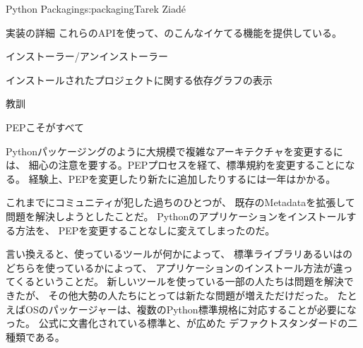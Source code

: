 \begin{aosachapter}{Python Packaging}{s:packaging}{Tarek Ziad\'{e}}
\begin{aosasect1}{実装の詳細}
これらのAPIを使って、のこんなイケてる機能を提供している。

\begin{aosaitemize}
  \item インストーラー/アンインストーラー
  \item インストールされたプロジェクトに関する依存グラフの表示
\end{aosaitemize}

\end{aosasect1}

\begin{aosasect1}{教訓}

\begin{aosasect2}{PEPこそがすべて}

Pythonパッケージングのように大規模で複雑なアーキテクチャを変更するには、
細心の注意を要する。PEPプロセスを経て、標準規約を変更することになる。
経験上、PEPを変更したり新たに追加したりするには一年はかかる。

これまでにコミュニティが犯した過ちのひとつが、
既存のMetadataを拡張して問題を解決しようとしたことだ。
Pythonのアプリケーションをインストールする方法を、
PEPを変更することなしに変えてしまったのだ。

言い換えると、使っているツールが何かによって、
標準ライブラリあるいはのどちらを使っているかによって、
アプリケーションのインストール方法が違ってくるということだ。
新しいツールを使っている一部の人たちは問題を解決できたが、
その他大勢の人たちにとっては新たな問題が増えただけだった。
たとえばOSのパッケージャーは、複数のPython標準規格に対応することが必要になった。
公式に文書化されている標準と、が広めた
デファクトスタンダードの二種類である。


\end{aosasect2}
\end{aosasect1}
\end{aosachapter}
